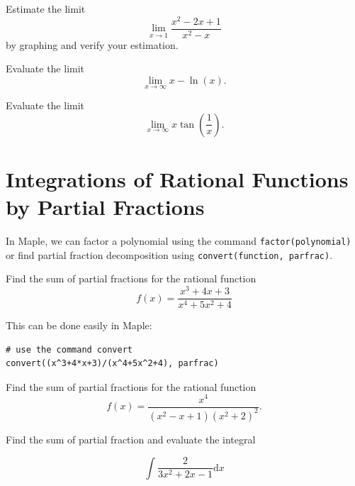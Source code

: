 \documentclass[]{book}
\theoremstyle{definition}
\theoremstyle{definition}
\theoremstyle{definition}
\theoremstyle{remark}
\let\BeginKnitrBlock\begin \let\EndKnitrBlock\end
\begin{document}
\BeginKnitrBlock{exercise}
\protect\hypertarget{exr:unnamed-chunk-3}{}{\label{exr:unnamed-chunk-3} }
Estimate the limit
\[
\lim\limits_{x\to 1}\frac{x^2-2x+1}{x^2-x}
\]
by graphing and verify your estimation.
\EndKnitrBlock{exercise}

\BeginKnitrBlock{exercise}
\protect\hypertarget{exr:unnamed-chunk-4}{}{\label{exr:unnamed-chunk-4} }
Evaluate the limit
\[
\lim\limits_{x\to \infty} x-\ln(x).
\]
\EndKnitrBlock{exercise}

\BeginKnitrBlock{exercise}
\protect\hypertarget{exr:unnamed-chunk-5}{}{\label{exr:unnamed-chunk-5} }
Evaluate the limit
\[
\lim\limits_{x\to \infty} x\tan(\frac1x).
\]
\EndKnitrBlock{exercise}

\hypertarget{integrations-of-rational-functions-by-partial-fractions}{%
\chapter{Integrations of Rational Functions by Partial Fractions}\label{integrations-of-rational-functions-by-partial-fractions}}

In Maple, we can factor a polynomial using the command \texttt{factor(polynomial)} or find partial fraction decomposition using \texttt{convert(function,\ parfrac)}.

\BeginKnitrBlock{example}
\protect\hypertarget{exm:unnamed-chunk-1}{}{\label{exm:unnamed-chunk-1} }
Find the sum of partial fractions for the rational function
\[
f(x)=\frac{x^3+4x+3}{x^4+5x^2+4}
\]
\EndKnitrBlock{example}

\BeginKnitrBlock{solution}
{}
This can be done easily in Maple:

\begin{verbatim}
# use the command convert
convert((x^3+4*x+3)/(x^4+5x^2+4), parfrac)
\end{verbatim}
\EndKnitrBlock{solution}

\BeginKnitrBlock{exercise}
\protect\hypertarget{exr:unnamed-chunk-3}{}{\label{exr:unnamed-chunk-3} }
Find the sum of partial fractions for the rational function
\[
f(x)=\frac{x^{4}}{\left(x^{2}-x+1\right)\left(x^{2}+2\right)^{2}}.
\]
\EndKnitrBlock{exercise}

\BeginKnitrBlock{exercise}
\protect\hypertarget{exr:unnamed-chunk-4}{}{\label{exr:unnamed-chunk-4} }
Find the sum of partial fraction and evaluate the integral

\[
\int \frac{2}{3x^{2}+2x-1} \mathrm{d} x
\]
\EndKnitrBlock{exercise}
\end{document}
